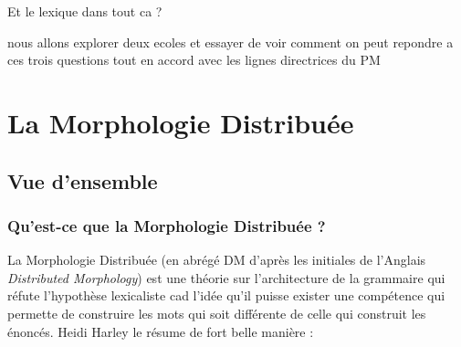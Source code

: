 Et le lexique dans tout ca ?

nous allons explorer deux ecoles et essayer de voir comment on peut
repondre a ces trois questions tout en accord avec les lignes directrices
du PM

  \section{La Morphologie Distribu\'ee}
    
    \subsection{Vue d'ensemble}
      \subsubsection{Qu'est-ce que la Morphologie Distribu\'ee ?}
      La Morphologie Distribu\'ee (en abr\'eg\'e DM d'apr\`es les initiales de l'Anglais \textit{Distributed Morphology}) est une th\'eorie sur l'architecture de la grammaire qui réfute l'hypoth\`ese lexicaliste cad l'id\'ee qu'il puisse exister une compétence qui permette de construire les mots qui soit différente de celle qui construit les \'enonc\'es. Heidi Harley le r\'esume de fort belle mani\`ere :

